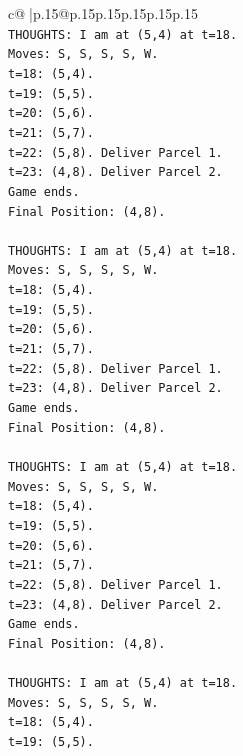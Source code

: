 \documentclass{article}
\begin{document}
{\begin{supertabular}{c@{$\;$}|p{.15\linewidth}@{}p{.15\linewidth}p{.15\linewidth}p{.15\linewidth}p{.15\linewidth}p{.15\linewidth}}
{{{\\ 
\texttt{THOUGHTS: I am at (5,4) at t=18.} \\
\texttt{Moves: S, S, S, S, W.} \\
\texttt{t=18: (5,4).} \\
\texttt{t=19: (5,5).} \\
\texttt{t=20: (5,6).} \\
\texttt{t=21: (5,7).} \\
\texttt{t=22: (5,8). Deliver Parcel 1.} \\
\texttt{t=23: (4,8). Deliver Parcel 2.} \\
\texttt{Game ends.} \\
\texttt{Final Position: (4,8).} \\
\\ 
\texttt{THOUGHTS: I am at (5,4) at t=18.} \\
\texttt{Moves: S, S, S, S, W.} \\
\texttt{t=18: (5,4).} \\
\texttt{t=19: (5,5).} \\
\texttt{t=20: (5,6).} \\
\texttt{t=21: (5,7).} \\
\texttt{t=22: (5,8). Deliver Parcel 1.} \\
\texttt{t=23: (4,8). Deliver Parcel 2.} \\
\texttt{Game ends.} \\
\texttt{Final Position: (4,8).} \\
\\ 
\texttt{THOUGHTS: I am at (5,4) at t=18.} \\
\texttt{Moves: S, S, S, S, W.} \\
\texttt{t=18: (5,4).} \\
\texttt{t=19: (5,5).} \\
\texttt{t=20: (5,6).} \\
\texttt{t=21: (5,7).} \\
\texttt{t=22: (5,8). Deliver Parcel 1.} \\
\texttt{t=23: (4,8). Deliver Parcel 2.} \\
\texttt{Game ends.} \\
\texttt{Final Position: (4,8).} \\
\\ 
\texttt{THOUGHTS: I am at (5,4) at t=18.} \\
\texttt{Moves: S, S, S, S, W.} \\
\texttt{t=18: (5,4).} \\
\texttt{t=19: (5,5).} \\
}}}
\end{supertabular}}
\end{document}
